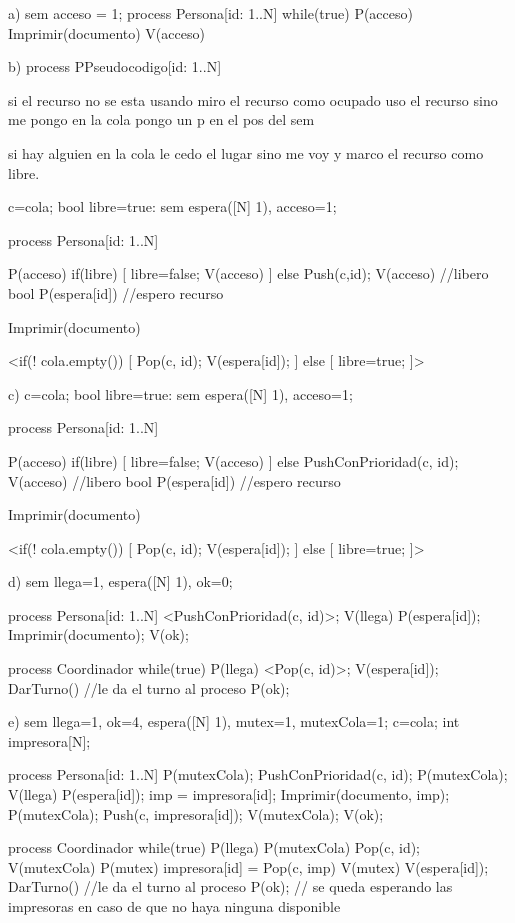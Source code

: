 a)
sem acceso = 1;
process Persona[id: 1..N]
{ while(true)
    {   P(acceso)
        Imprimir(documento)
        V(acceso)
    }
}

b)
process PPseudocodigo[id: 1..N]
{
    si el recurso no se esta usando
        miro el recurso como ocupado
        uso el recurso
    sino
        me pongo en la cola
        pongo un p en el pos del sem
    
    si hay alguien en la cola
        le cedo el lugar
    sino
        me voy y marco el recurso como libre.
}

c=cola;
bool libre=true:
sem espera([N] 1), acceso=1;


process Persona[id: 1..N]
{
    P(acceso)
    if(libre)
    [
        libre=false;
        V(acceso)
    ] else
    {
        Push(c,id);
        V(acceso) //libero bool
        P(espera[id]) //espero recurso
    }

    Imprimir(documento)

    <if(! cola.empty())
    [
        Pop(c, id);
        V(espera[id]);
    ] else
    [
        libre=true;
    ]>
}

c)
c=cola;
bool libre=true:
sem espera([N] 1), acceso=1;

process Persona[id: 1..N]
{
    P(acceso)
    if(libre)
    [
        libre=false;
        V(acceso)
    ] else
    {
        PushConPrioridad(c, id);
        V(acceso) //libero bool
        P(espera[id]) //espero recurso
    }

    Imprimir(documento)

    <if(! cola.empty())
    [
        Pop(c, id);
        V(espera[id]);
    ] else
    [
        libre=true;
    ]>
}

d)
sem llega=1, espera([N] 1), ok=0;

process Persona[id: 1..N]
{
    <PushConPrioridad(c, id)>;
    V(llega)
    P(espera[id]);
    Imprimir(documento);
    V(ok);
}

process Coordinador
{
    while(true)
    {
        P(llega)
        <Pop(c, id)>;
        V(espera[id]);
        DarTurno() //le da el turno al proceso
        P(ok);
    }
}

e)
sem llega=1, ok=4, espera([N] 1), mutex=1, mutexCola=1;
c=cola; int impresora[N];

process Persona[id: 1..N]
{
    P(mutexCola);
    PushConPrioridad(c, id);
    P(mutexCola);
    V(llega)
    P(espera[id]);
    imp = impresora[id];
    Imprimir(documento, imp);
    P(mutexCola);
    Push(c, impresora[id]);
    V(mutexCola);
    V(ok);
}

process Coordinador
{
    while(true)
    {
        P(llega) 
        P(mutexCola)
        Pop(c, id);
        V(mutexCola)
        P(mutex)
        impresora[id] = Pop(c, imp)
        V(mutex)
        V(espera[id]);
        DarTurno() //le da el turno al proceso
        P(ok); // se queda esperando las impresoras en caso de que no haya ninguna disponible
    }
}
